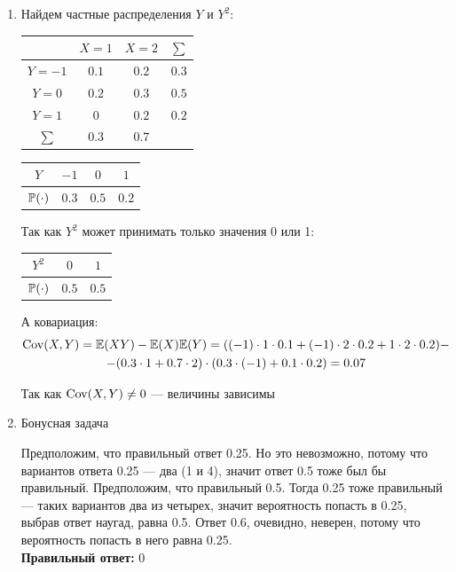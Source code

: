 \documentclass[12pt, a4paper]{article}\usepackage[]{graphicx}\usepackage[]{color}
\begin{document}
\begin{enumerate}
\item Найдем частные распределения $Y$ и $Y^2$:
\begin{center}
\begin{tabular}{c|cc|c}
\toprule
 & $X=1$ & $X=2$ & $\sum$ \\ \midrule
$Y=-1$ & $0.1$ & $0.2$ & $0.3$ \\
$Y=0$ & $0.2$ & $0.3$ & $0.5$ \\
$Y=1$ & $0$ & $0.2$ & $0.2$ \\
$\sum$ & $0.3$ & $0.7$ & \\ \bottomrule
\end{tabular}
\end{center}

\begin{center}
\begin{tabular}{@{}cccc@{}}
\toprule
$Y$         & $-1$             & $0$      & $1$         \\ \midrule
$\P(\cdot)$ & $0.3$ & $0.5$  & $0.2$\\ \bottomrule
\end{tabular}
\end{center}

Так как $Y^2$ может принимать только значения 0 или 1:

\begin{center}
\begin{tabular}{@{}ccc@{}}
\toprule
$Y^2$         & $0$             & $1$               \\ \midrule
$\P(\cdot)$ & $0.5$ & $0.5$ \\ \bottomrule
\end{tabular}
\end{center}
А ковариация:
 \begin{multline*}
 \Cov(X, Y) = \E(XY) - \E(X)\E(Y) =
 ((-1)\cdot 1\cdot0.1 + (-1)\cdot2 \cdot 0.2 + 1\cdot2\cdot 0.2) -\\
 - (0.3\cdot1 + 0.7 \cdot 2)\cdot(0.3\cdot(-1) + 0.1\cdot 0.2) = 0.07
\end{multline*}

Так как $\Cov(X, Y) \ne 0$ — величины зависимы

\item Бонусная задача

Предположим, что правильный ответ 0.25. Но это невозможно, потому что вариантов ответа 0.25 — два (1 и 4), значит ответ 0.5 тоже был бы правильный. Предположим, что правильный 0.5. Тогда 0.25 тоже правильный — таких вариантов два из четырех, значит вероятность попасть в 0.25, выбрав ответ наугад, равна 0.5. Ответ 0.6, очевидно, неверен, потому что вероятность попасть в него равна 0.25. \\
\textbf{Правильный ответ:} 0
\end{enumerate}
\end{document}
